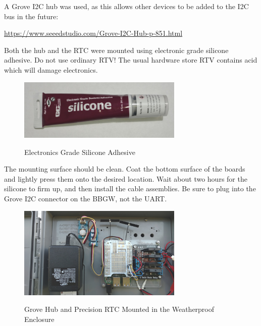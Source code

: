 A Grove I2C hub was used, as this allows other devices to be added to the I2C bus in the future:

\url{https://www.seeedstudio.com/Grove-I2C-Hub-p-851.html}

Both the hub and the RTC were mounted using electronic grade silicone adhesive.  Do not use ordinary RTV!  The usual hardware store RTV contains acid which will damage electronics.

\begin{figure}[H]
	\centering
	\includegraphics[width=0.7\textwidth]{photos/silicone}
	\centering\bfseries
	\caption{Electronics Grade Silicone Adhesive}
\end{figure}

The mounting surface should be clean.  Coat the bottom surface of the boards and lightly press them onto the desired location.  Wait about two hours for the silicone to firm up, and then install the cable assemblies.  Be sure to plug into the Grove I2C connector on the BBGW, not the UART.

\begin{figure}[H]
	\centering
	\includegraphics[width=0.7\textwidth]{photos/rtc-mounted}
	\centering\bfseries
	\caption{Grove Hub and Precision RTC Mounted in the Weatherproof Enclosure}
\end{figure}



